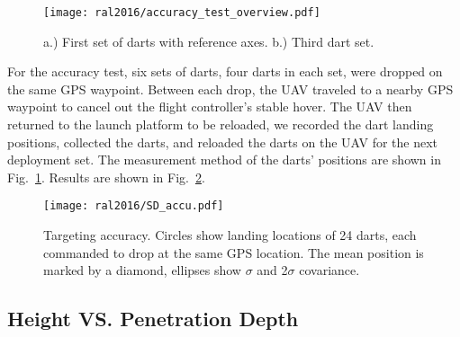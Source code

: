 

\begin{figure} \centering
  {\texttt{[image: ral2016/accuracy\_test\_overview.pdf]}}
 \caption{a.) First set of darts with reference axes. b.) Third dart set. }
 \label{fig:Accu_test_darts}
\end{figure}

For the accuracy test, six sets of darts, four darts in each set, were dropped on the same GPS waypoint.
Between each drop, the UAV traveled to a nearby GPS waypoint to cancel out the flight controller's stable hover.
The UAV then returned to the launch platform to be reloaded, we recorded the dart landing positions, collected the darts, and reloaded the darts on the UAV for the next deployment set.
The measurement method of the darts' positions are shown in Fig.~\ref{fig:Accu_test_darts}.
Results are shown in Fig.~\ref{fig:SD_accu.pdf}.

\begin{figure} \centering
	{\texttt{[image: ral2016/SD\_accu.pdf]}}
	\caption{
		Targeting accuracy.
		Circles show landing locations of 24 darts, each commanded to drop at the same GPS location.
		The mean position is marked by a diamond, ellipses show  $\sigma$ and 2$\sigma$ covariance.
	\label{fig:SD_accu.pdf}}
\end{figure}


\subsection{Height VS. Penetration Depth}

